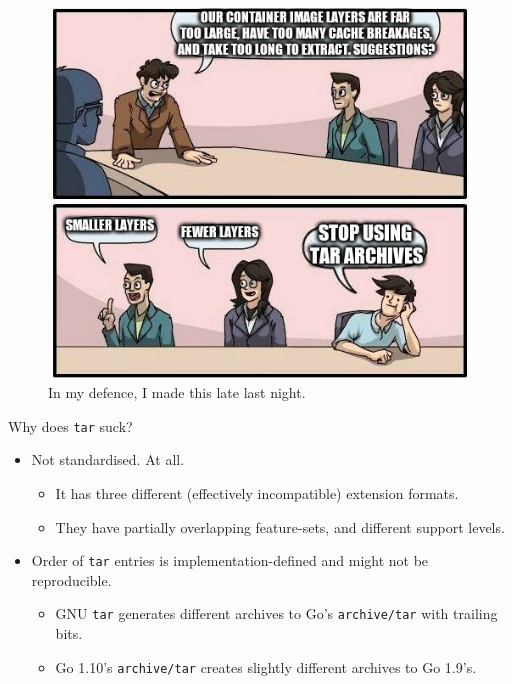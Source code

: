 \documentclass[10pt,aspectratio=169]{beamer}
\begin{document}
	\begin{frame}
		\vfill
		\begin{figure}
			\centering
				\includegraphics[height=0.85\textheight,width=\linewidth,keepaspectratio]{very_dead_meme}
			\caption{In my defence, I made this late last night.}
			\label{fig:my_label}
		\end{figure}
	\end{frame}

	\begin{frame}{Why does \texttt{tar} suck?}
		\begin{itemize}
			\item Not standardised. At all.
			\begin{itemize}
				\item It has three different (effectively incompatible) extension formats.
				\item They have partially overlapping feature-sets, and different support levels.
			\end{itemize}
			\item Order of \texttt{tar} entries is implementation-defined and might not be reproducible.
			\begin{itemize}
				\item GNU \texttt{tar} generates different archives to Go's \texttt{archive/tar} with trailing bits.
				\item Go 1.10's \texttt{archive/tar} creates slightly different archives to Go 1.9's.
			\end{itemize}
		\end{itemize}
	\end{frame}
\end{document}
